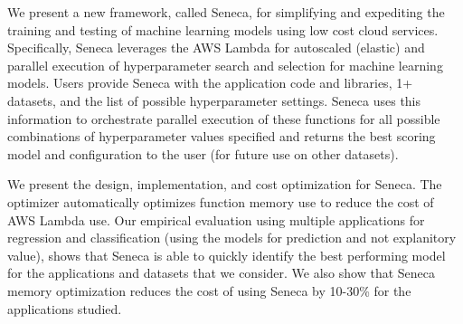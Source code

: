 
We present a new framework, called Seneca, for simplifying and expediting
the training and testing of machine learning models
using low cost cloud services.
Specifically, Seneca leverages the AWS Lambda for autoscaled
(elastic) and parallel execution of hyperparameter search 
and selection for machine learning models.  
Users provide Seneca with the application code and libraries, 1+ datasets, and the list 
of possible hyperparameter settings.  
Seneca uses this information to orchestrate parallel execution of these functions for all possible 
combinations of hyperparameter values specified and returns the best scoring model
and configuration to the user (for future use on other datasets).

We present the design, implementation, and cost optimization for Seneca.
The optimizer automatically optimizes function memory use to reduce the cost
of AWS Lambda use.  Our empirical evaluation using
multiple applications for regression and classification (using
the models for prediction and not explanitory value), shows that Seneca is able to quickly
identify the best performing model for the applications and datasets that we consider.  
We also show that Seneca memory optimization reduces the cost of using
Seneca by 10-30\% for the applications studied.


